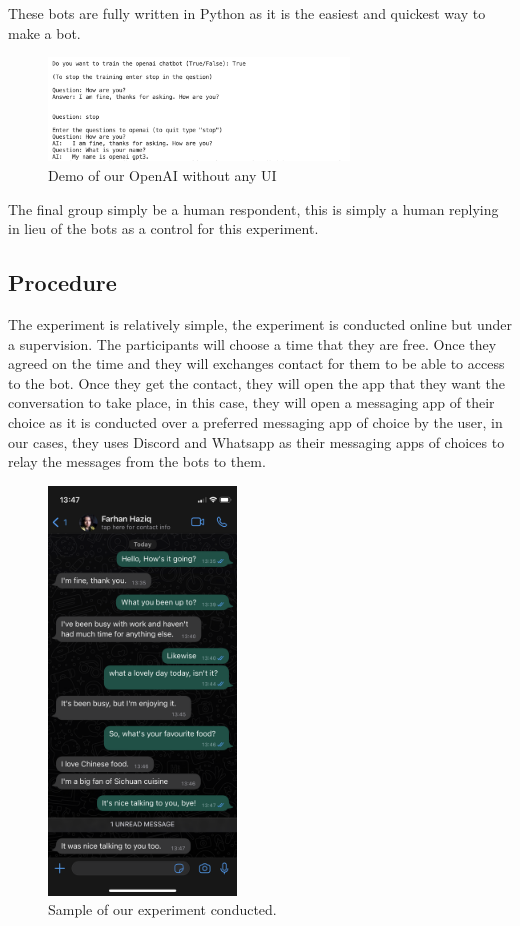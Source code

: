 \documentclass{vgtc}                          %
\begin{document}
These bots are fully written in Python as it is the easiest and quickest way to make a bot.
{
\centering
\begin{figure}[h]
\includegraphics[width=8cm]{Openai-gpt3-chatbot-output}
\caption{Demo of our OpenAI without any UI}
\end{figure}
}
The final group simply be a human respondent, this is simply a human replying in lieu of the bots as a control for this experiment.

\subsection{Procedure}
The experiment is relatively simple, the experiment is conducted online but under a supervision. The participants will choose a time that they are free. Once they agreed on the time and they will exchanges contact for them to be able to access to the bot. Once they get the contact, they will open the app that they want the conversation to take place, in this case, they will open a messaging app of their choice as it is conducted over a preferred messaging app of choice by the user, in our cases, they uses Discord and Whatsapp as their messaging apps of choices to relay the messages from the bots to them.

{
\begin{figure}[h]
\centering
\caption{Sample of our experiment conducted.}
\includegraphics[width=5cm]{demo}
\end{figure}
}
\end{document}
